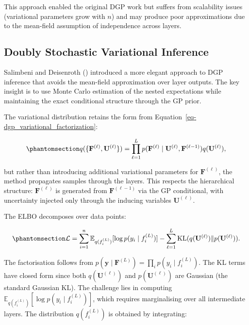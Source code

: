 \documentclass[
  letterpaper,
  DIV=11,
  numbers=noendperiod]{scrartcl}
\begin{document}
This approach enabled the original DGP work but suffers from scalability
issues (variational parameters grow with \(n\)) and may produce poor
approximations due to the mean-field assumption of independence across
layers.

\subsection{Doubly Stochastic Variational
Inference}\label{doubly-stochastic-variational-inference}

Salimbeni and Deisenroth ()
introduced a more elegant approach to DGP inference that avoids the
mean-field approximation over layer outputs. The key insight is to use
Monte Carlo estimation of the nested expectations while maintaining the
exact conditional structure through the GP prior.

The variational distribution retains the form from
Equation~\ref{eq-dgp_variational_factorization}:

\begin{equation}\phantomsection\label{eq-dsvi_variational}{
q(\{\mathbf{F}^{(\ell)}, \mathbf{U}^{(\ell)}\}) = \prod_{\ell=1}^{L} p(\mathbf{F}^{(\ell)} \mid \mathbf{U}^{(\ell)}, \mathbf{F}^{(\ell-1)}) q(\mathbf{U}^{(\ell)}),
}\end{equation}

but rather than introducing additional variational parameters for
\(\mathbf{F}^{(\ell)}\), the method propagates samples through the
layers. This respects the hierarchical structure:
\(\mathbf{F}^{(\ell)}\) is generated from \(\mathbf{F}^{(\ell-1)}\) via
the GP conditional, with uncertainty injected only through the inducing
variables \(\mathbf{U}^{(\ell)}\).

The ELBO decomposes over data points:

\begin{equation}\phantomsection\label{eq-dsvi_elbo}{
\mathcal{L} = \sum_{i=1}^{n} \mathbb{E}_{q(f_i^{(L)})}[\log p(y_i \mid f_i^{(L)})] - \sum_{\ell=1}^{L} \operatorname{KL}(q(\mathbf{U}^{(\ell)}) \| p(\mathbf{U}^{(\ell)})).
}\end{equation}

The factorisation follows from
\(p(\mathbf{y} \mid \mathbf{F}^{(L)}) = \prod_i p(y_i \mid f_i^{(L)})\).
The KL terms have closed form since both \(q(\mathbf{U}^{(\ell)})\) and
\(p(\mathbf{U}^{(\ell)})\) are Gaussian (the standard Gaussian KL). The
challenge lies in computing
\(\mathbb{E}_{q(f_i^{(L)})}[\log p(y_i \mid f_i^{(L)})]\), which
requires marginalising over all intermediate layers. The distribution
\(q(f_i^{(L)})\) is obtained by integrating:
\end{document}
